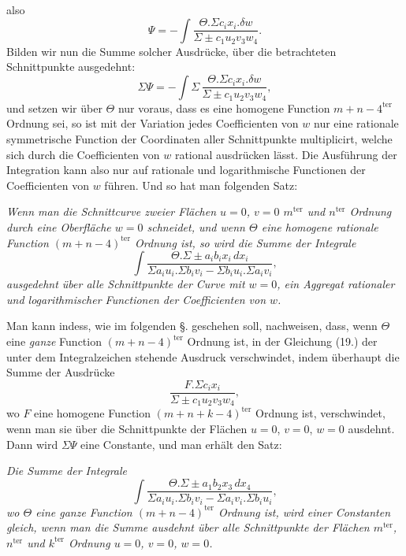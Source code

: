 \documentclass{article}
\begin{document}
also
\[
\Psi = -\int \frac{\Theta.\Sigma c_{i}x_{i}.\delta w}{\Sigma\pm c_{1}u_{2}v_{3}w_{4}}.
\]
Bilden wir nun die Summe solcher Ausdrücke, über die betrachteten Schnittpunkte ausgedehnt:
\[
\Sigma\Psi = -\int\Sigma\,\frac{\Theta.\Sigma c_{i}x_{i}.\delta w}{\Sigma\pm c_{1}u_{2}v_{3}w_{4}}, \tag{19.}
\]
und setzen wir über $\Theta$ nur voraus, dass es eine homogene Function $m+n-4^{\text{ter}}$ Ordnung sei, so ist mit der Variation jedes Coefficienten von $w$ nur eine rationale symmetrische Function der Coordinaten aller Schnittpunkte multiplicirt, welche sich durch die Coefficienten von $w$ rational ausdrücken lässt. Die Ausführung der Integration kann also nur auf rationale und logarithmische Functionen der Coefficienten von $w$ führen. Und so hat man folgenden Satz:

\emph{Wenn man die Schnittcurve zweier Flächen $u=0$, $v=0$ $m^{\text{ter}}$ und $n^{\text{ter}}$ Ordnung durch eine Oberfläche $w=0$ schneidet, und wenn $\Theta$ eine homogene rationale Function $(m+n-4)^{\text{ter}}$ Ordnung ist, so wird die Summe der Integrale}
\[
\int \frac{\Theta.\Sigma\pm a_{i}b_{i}x_{i}\,dx_{i}}{\Sigma a_{i}u_{i}.\Sigma b_{i}v_{i} - \Sigma b_{i}u_{i}.\Sigma a_{i}v_{i}},
\]
\emph{ausgedehnt über alle Schnittpunkte der Curve mit $w=0$, ein Aggregat rationaler und logarithmischer Functionen der Coefficienten von $w$.}

Man kann indess, wie im folgenden §. geschehen soll, nachweisen, dass, wenn $\Theta$ eine \emph{ganze} Function $(m+n-4)^{\text{ter}}$ Ordnung ist, in der Gleichung (19.) der unter dem Integralzeichen stehende Ausdruck verschwindet, indem überhaupt die Summe der Ausdrücke
\[
\frac{F.\Sigma c_{i}x_{i}}{\Sigma\pm c_{1}u_{2}v_{3}w_{4}},
\]
wo $F$ eine homogene Function $(m+n+k-4)^{\text{ter}}$ Ordnung ist, verschwindet, wenn man sie über die Schnittpunkte der Flächen $u=0$, $v=0$, $w=0$ ausdehnt. Dann wird $\Sigma\Psi$ eine Constante, und man erhält den Satz:

\emph{Die Summe der Integrale}
\[
\int \frac{\Theta.\Sigma\pm a_{1}b_{2}x_{3}\,dx_{4}}{\Sigma a_{i}u_{i}.\Sigma b_{i}v_{i} - \Sigma a_{i}v_{i}.\Sigma b_{i}u_{i}},
\]
\emph{wo $\Theta$ eine ganze Function $(m+n-4)^{\text{ter}}$ Ordnung ist, wird einer Constanten gleich, wenn man die Summe ausdehnt über alle Schnittpunkte der Flächen $m^{\text{ter}}$, $n^{\text{ter}}$ und $k^{\text{ter}}$ Ordnung $u=0$, $v=0$, $w=0$.}
\end{document}
